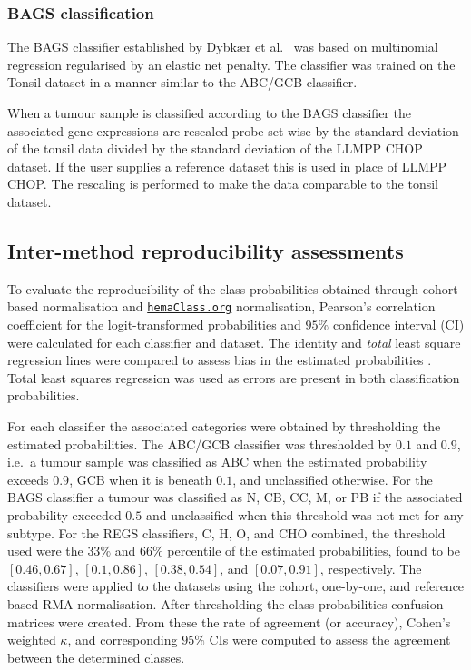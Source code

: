 \documentclass[twocolumn]{bmcart}%
\newcommand{\hemaClass}{\href{http://hemaClass.org}{\texttt{hemaClass.org}}}
\begin{document}
\subsubsection{BAGS classification}
The BAGS classifier established by Dybk{\ae}r et al.~\cite{DybkaerBoegsted2015} was based on multinomial regression regularised by an elastic net penalty.
The classifier was trained on the Tonsil dataset in a manner similar to the ABC/GCB classifier.

When a tumour sample is classified according to the BAGS classifier the associated gene expressions are rescaled probe-set wise by the standard deviation of the tonsil data divided by the standard deviation of the LLMPP CHOP dataset.
If the user supplies a reference dataset this is used in place of LLMPP CHOP.
The rescaling is performed to make the data comparable to the tonsil dataset.



\subsection{Inter-method reproducibility assessments}
To evaluate the reproducibility of the class probabilities obtained through cohort based normalisation and \hemaClass{} normalisation, Pearson's correlation coefficient for the logit-transformed probabilities and $95\%$ confidence interval (CI) were calculated for each classifier and dataset.
The identity and \emph{total} least square regression lines were compared to assess bias in the estimated probabilities \cite{CHEN1989}.
Total least squares regression was used as errors are present in both classification probabilities.

For each classifier the associated categories were obtained by thresholding the estimated probabilities.
The ABC/GCB classifier was thresholded by $0.1$ and $0.9$, i.e.\ a tumour sample was classified as ABC when the estimated probability exceeds $0.9$, GCB when it is beneath $0.1$, and unclassified otherwise.
For the BAGS classifier a tumour was classified as N, CB, CC, M, or PB if the associated probability exceeded $0.5$ and unclassified when this threshold was not met for any subtype.
For the REGS classifiers, C, H, O, and CHO combined, the threshold used were the $33\%$ and $66\%$ percentile of the estimated probabilities, found to be $[0.46, 0.67]$, $[0.1, 0.86]$, $[0.38, 0.54]$, and $[0.07, 0.91]$, respectively.
The classifiers were applied to the datasets using the cohort, one-by-one, and reference based RMA normalisation.
After thresholding the class probabilities confusion matrices were created.
From these the rate of agreement (or accuracy), Cohen's weighted $\kappa$, and corresponding $95\%$ CIs were computed to assess the agreement between the determined classes.
\end{document}
